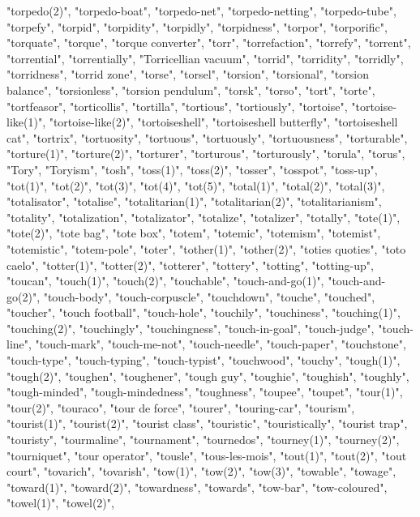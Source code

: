 "torpedo(2)",
"torpedo-boat",
"torpedo-net",
"torpedo-netting",
"torpedo-tube",
"torpefy",
"torpid",
"torpidity",
"torpidly",
"torpidness",
"torpor",
"torporific",
"torquate",
"torque",
"torque converter",
"torr",
"torrefaction",
"torrefy",
"torrent",
"torrential",
"torrentially",
"Torricellian vacuum",
"torrid",
"torridity",
"torridly",
"torridness",
"torrid zone",
"torse",
"torsel",
"torsion",
"torsional",
"torsion balance",
"torsionless",
"torsion pendulum",
"torsk",
"torso",
"tort",
"torte",
"tortfeasor",
"torticollis",
"tortilla",
"tortious",
"tortiously",
"tortoise",
"tortoise-like(1)",
"tortoise-like(2)",
"tortoiseshell",
"tortoiseshell butterfly",
"tortoiseshell cat",
"tortrix",
"tortuosity",
"tortuous",
"tortuously",
"tortuousness",
"torturable",
"torture(1)",
"torture(2)",
"torturer",
"torturous",
"torturously",
"torula",
"torus",
"Tory",
"Toryism",
"tosh",
"toss(1)",
"toss(2)",
"tosser",
"tosspot",
"toss-up",
"tot(1)",
"tot(2)",
"tot(3)",
"tot(4)",
"tot(5)",
"total(1)",
"total(2)",
"total(3)",
"totalisator",
"totalise",
"totalitarian(1)",
"totalitarian(2)",
"totalitarianism",
"totality",
"totalization",
"totalizator",
"totalize",
"totalizer",
"totally",
"tote(1)",
"tote(2)",
"tote bag",
"tote box",
"totem",
"totemic",
"totemism",
"totemist",
"totemistic",
"totem-pole",
"toter",
"tother(1)",
"tother(2)",
"toties quoties",
"toto caelo",
"totter(1)",
"totter(2)",
"totterer",
"tottery",
"totting",
"totting-up",
"toucan",
"touch(1)",
"touch(2)",
"touchable",
"touch-and-go(1)",
"touch-and-go(2)",
"touch-body",
"touch-corpuscle",
"touchdown",
"touche",
"touched",
"toucher",
"touch football",
"touch-hole",
"touchily",
"touchiness",
"touching(1)",
"touching(2)",
"touchingly",
"touchingness",
"touch-in-goal",
"touch-judge",
"touch-line",
"touch-mark",
"touch-me-not",
"touch-needle",
"touch-paper",
"touchstone",
"touch-type",
"touch-typing",
"touch-typist",
"touchwood",
"touchy",
"tough(1)",
"tough(2)",
"toughen",
"toughener",
"tough guy",
"toughie",
"toughish",
"toughly",
"tough-minded",
"tough-mindedness",
"toughness",
"toupee",
"toupet",
"tour(1)",
"tour(2)",
"touraco",
"tour de force",
"tourer",
"touring-car",
"tourism",
"tourist(1)",
"tourist(2)",
"tourist class",
"touristic",
"touristically",
"tourist trap",
"touristy",
"tourmaline",
"tournament",
"tournedos",
"tourney(1)",
"tourney(2)",
"tourniquet",
"tour operator",
"tousle",
"tous-les-mois",
"tout(1)",
"tout(2)",
"tout court",
"tovarich",
"tovarish",
"tow(1)",
"tow(2)",
"tow(3)",
"towable",
"towage",
"toward(1)",
"toward(2)",
"towardness",
"towards",
"tow-bar",
"tow-coloured",
"towel(1)",
"towel(2)",
